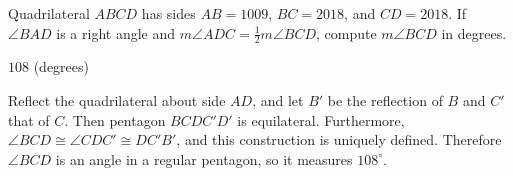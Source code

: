 \documentclass[11pt]{article}
\begin{document}
\begin{problem}
Quadrilateral $ABCD$ has sides $AB = 1009$, $BC = 2018$, and $CD = 2018$. If $\angle BAD$ is a right angle 
and $m\angle ADC = \frac{1}{2}m\angle BCD$, compute $m\angle BCD$ in degrees.
\end{problem}

\begin{answer}
$\boxed{108}$ (degrees)
\end{answer}

\begin{solution}
Reflect the quadrilateral about side $AD$, and let $B'$ be the reflection of $B$ and $C'$ that of $C$. 
Then pentagon $BCDC'D'$ is equilateral. Furthermore, $\angle BCD \cong \angle CDC' \cong DC'B'$, 
and this construction is uniquely defined. Therefore $\angle BCD$ is an angle in a regular pentagon, 
so it measures $\boxed{108^\circ}$.
\end{solution}
\end{document}
